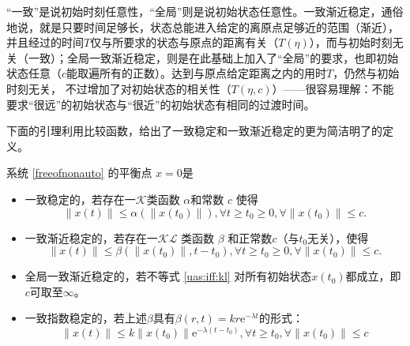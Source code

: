\begin{note}
  “一致”是说初始时刻任意性，“全局”则是说初始状态任意性。一致渐近稳定，通俗地说，就是只要时间足够长，状态总能进入给定的离原点足够近的范围（渐近），
  并且经过的时间$T$仅与所要求的状态与原点的距离有关（$T(\eta)$），而与初始时刻无关（一致）；全局一致渐近稳定，则是在此基础上加入了“全局”的要求，也即初始状态任意（$c$能取遍所有的正数）。达到与原点给定距离之内的用时$T$，仍然与初始时刻无关，
  不过增加了对初始状态的相关性（$T(\eta,c)$）——很容易理解：不能要求“很远”的初始状态与“很近”的初始状态有相同的过渡时间。
\end{note}
下面的引理利用比较函数，给出了一致稳定和一致渐近稳定的更为简洁明了的定义。
\begin{lemma}
  系统 \eqref{freeofnonauto} 的平衡点 $x = 0$是
  \begin{itemize}[leftmargin=1em]
  \item 一致稳定的，若存在一$\mathcal{K}$类函数 $\alpha$和常数
  $c$ 使得
   \[ \| x (t) \| \leq \alpha (\| x (t_0) \|), \forall t \geq t_0 \geq 0,
       \forall \| x (t_0) \| \le c. \]
  \item 一致渐近稳定的，若存在一$\mathcal{K}\mathcal{L}$ 类函数 $\beta$ 和正常数$c$（与$t_0$无关），使得
  \begin{equation}
    \| x (t) \| \leq \beta (\| x (t_0) \|, t - t_0), \forall t \geq t_0 \geq
    0, \forall \| x (t_0) \| \le  c \label{uas:iff:kl} .
  \end{equation}
  \item 全局一致渐近稳定的，若不等式 \eqref{uas:iff:kl} 对所有初始状态$x (t_0)$都成立，即$c$可取至$\infty$。
  \item 一致指数稳定的，若上述$\beta$具有$\beta(r,t)=kr\mathrm{e}^{-\lambda t}$的形式：
  \[\|x(t)\|\le k\|x(t_0)\|\mathrm{e}^{-\lambda(t-t_0)}, \forall t \geq t_0,\forall \| x (t_0) \| \le  c \]
  \end{itemize}
\end{lemma}

